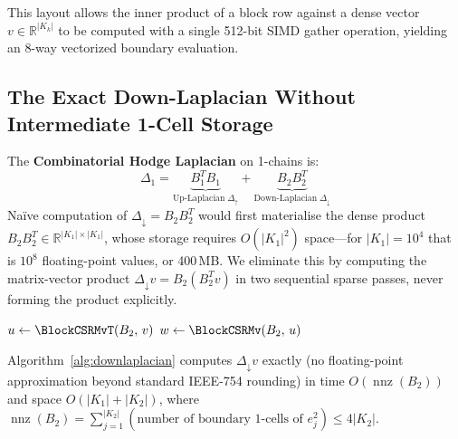This layout allows the inner product of a block row against a dense
vector $v \in \mathbb{R}^{|K_k|}$ to be computed with a single 512-bit
SIMD gather operation, yielding an 8-way vectorized boundary evaluation.

\subsection{The Exact Down-Laplacian Without Intermediate 1-Cell Storage}
\label{subsec:downlaplacian}

The \textbf{Combinatorial Hodge Laplacian} on 1-chains is:
\begin{equation}
    \Delta_1 = \underbrace{B_1^T B_1}_{\text{Up-Laplacian}\;\Delta_\uparrow}
              + \underbrace{B_2 B_2^T}_{\text{Down-Laplacian}\;\Delta_\downarrow}
\end{equation}
Naïve computation of $\Delta_\downarrow = B_2 B_2^T$ would first
materialise the dense product $B_2 B_2^T \in \mathbb{R}^{|K_1|\times|K_1|}$,
whose storage requires $O(|K_1|^2)$ space---for $|K_1| = 10^4$ that is
$10^8$ floating-point values, or 400\,MB.  We eliminate this by computing
the matrix-vector product $\Delta_\downarrow v = B_2(B_2^T v)$ in two
sequential sparse passes, never forming the product explicitly.

\begin{algorithm}[H]
\caption{Exact Block-CSR Action of $\Delta_\downarrow = B_2 B_2^T$ on a vector $v$.}
\label{alg:downlaplacian}
\BlankLine
$u \leftarrow \BlockCSRMvT(B_2,\, v)$
$w \leftarrow \BlockCSRMv(B_2,\, u)$
\end{algorithm}

\begin{theorem}
\label{thm:downlaplacian}
Algorithm~\ref{alg:downlaplacian} computes $\Delta_\downarrow v$ exactly
(no floating-point approximation beyond standard IEEE-754 rounding) in
time $O(\operatorname{nnz}(B_2))$ and space $O(|K_1| + |K_2|)$, where
$\operatorname{nnz}(B_2) = \sum_{j=1}^{|K_2|}(\text{number of boundary 1-cells of }e_j^2) \le 4|K_2|$.
\end{theorem}

